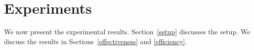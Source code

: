 \section{Experiments}
\label{experiment}

We now present the experimental results. Section~\ref{setup} discusses the setup. We discuss the results in Sections~\ref{effectiveness} and \ref{efficiency}.





 